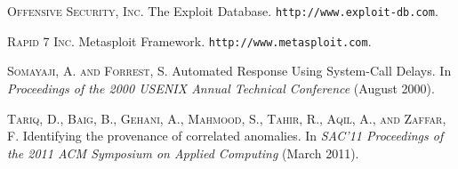 \documentclass[10pt,twocolumn]{article}
\begin{document}
\begin{thebibliography}{99}
\textsc{Offensive Security, Inc.} The Exploit Database. {\tt http://www.exploit-db.com}.

\textsc{Rapid 7 Inc.} Metasploit Framework. {\tt http://www.metasploit.com}.

\textsc{Somayaji, A. and Forrest, S.} Automated Response Using System-Call Delays. In {\em Proceedings of the 2000 USENIX Annual Technical Conference} (August 2000).

\textsc{Tariq, D., Baig, B., Gehani, A., Mahmood, S., Tahir, R., Aqil, A., and Zaffar, F.} Identifying the provenance of correlated anomalies. In {\em SAC'11 Proceedings of the 2011 ACM Symposium on Applied Computing} (March 2011).

\end{thebibliography}
\end{document}
